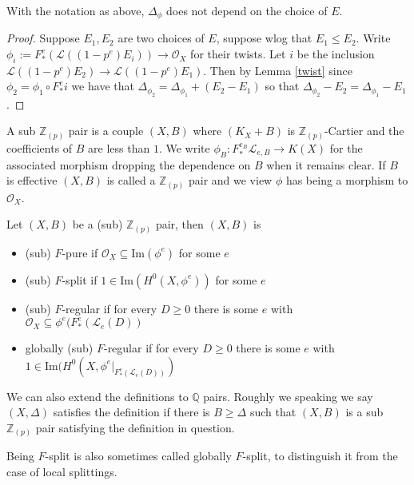 \documentclass[a4paper,12pt]{book}
\newcommand{\Fe}{F^{e}_{*}}
\newcommand{\ox}[1][X]{\mathcal{O}_{#1}}
\newcommand{\zp}{\mathbb{Z}_{(p)}}
\begin{document}
\begin{lemma}
	With the notation as above, $\Delta_{\phi}$ does not depend on the choice of $E$.
\end{lemma}
\begin{proof}
	Suppose $E_{1},E_{2}$ are two choices of $E$, suppose wlog that $E_{1} \leq E_{2}$. Write $\phi_{i}:=\Fe(\mathcal{L}((1-p^{e})E_{i})) \to \ox$ for their twists. Let $i$ be the inclusion $\mathcal{L}((1-p^{e})E_{2}) \to\mathcal{L}((1-p^{e})E_{1})$. Then by Lemma \ref{twist} since $\phi_{2}=\phi_{1}\circ F_{*}^{e}i$ we have that $\Delta_{\phi_{2}}=\Delta_{\phi_{1}}+(E_{2}-E_{1})$ so that $\Delta_{\phi_{2}}-E_{2}=\Delta_{\phi_{1}}-E_{1}$.
\end{proof}


\begin{definition}
	A sub $\zp$ pair is a couple $(X,B)$ where $(K_{X}+B)$ is $\zp$-Cartier and the coefficients of $B$ are less than $1$. We write $\phi_{B}: F_{*}^{e_{B}}\mathcal{L}_{e,B} \to K(X)$ for the associated morphism dropping the dependence on $B$ when it remains clear. If $B$ is effective $(X,B)$ is called a $\zp$ pair and we view $\phi$ has being a morphism to $\ox$.
	
	Let $(X,B)$ be a (sub) $\zp$ pair, then $(X,B)$ is
	\begin{itemize}
		\item (sub) $F$-pure if $\ox \subseteq \text{Im}(\phi^{e})$ for some $e$
		\item (sub) $F$-split if $1\in\text{Im}(H^{0}(X,\phi^{e}))$ for some $e$
		\item (sub) $F$-regular if for every $D \geq 0$ there is some $e$ with $\ox \subseteq \phi^{e}(\Fe(\mathcal{L}_{e}(D))$ 
		\item globally (sub) $F$-regular if for every $D \geq 0$ there is some $e$ with $1\in\text{Im}(H^{0}(X,\phi^{e}|_{\Fe(\mathcal{L}_{e}(D))})$ 
	\end{itemize}
\end{definition}

\begin{remark}
	
	We can also extend the definitions to $\mathbb{Q}$ pairs. Roughly we speaking we say $(X,\Delta)$ satisfies the definition if there is $B \geq \Delta$ such that $(X,B)$ is a sub $\zp$ pair satisfying the definition in question. 	
	\end{remark}

Being $F$-split is also sometimes called globally $F$-split, to distinguish it from the case of local splittings.
\end{document}

